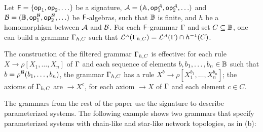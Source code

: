 \begin{theorem}\label{thm:filtering}
  Let $\mathsf{F}={\{ {\mathsf{op}_1, \mathsf{op}_2, \ldots} \}}$ be a signature,
  $\mathcal{A}=(\mathbb{A}, \mathsf{op}^{\mathcal{A}}_1, \mathsf{op}^{\mathcal{A}}_2,
  \ldots)$ and $\mathcal{B}=(\mathbb{B}, \mathsf{op}^{\mathcal{B}}_1,
  \mathsf{op}^{\mathcal{B}}_2, \ldots)$ be $\mathsf{F}$-algebras, such that
  $\mathbb{B}$ is finite, and $h$ be a homomorphism between
  $\mathcal{A}$ and $\mathcal{B}$. For each $\mathsf{F}$-grammar
  $\Gamma$ and set $C \subseteq \mathbb{B}$, one can build a
  grammar $\Gamma_{h,C}$ such that
  $\mathcal{L}_{}^{\scriptscriptstyle{\mathcal{A}}}({\Gamma_{h,C}}) =
  \mathcal{L}_{}^{\scriptscriptstyle{\mathcal{A}}}({\Gamma}) \cap h^{-1}(C)$.
\end{theorem}
\noindent The construction of the filtered grammar $\Gamma_{h,C}$ is
effective: for each rule $X \rightarrow \rho[X_1,\ldots,X_n]$ of
$\Gamma$ and each sequence of elements $b, b_1, \ldots, b_n \in
\mathbb{B}$ such that $b = \rho^{\mathcal{B}}(b_1,\ldots,b_n)$, the
grammar $\Gamma_{h,C}$ has a rule $X^b \rightarrow
\rho[X_1^{b_1},\ldots,X_n^{b_n}]$; the axioms of $\Gamma_{h,C}$ are
$\rightarrow X^c$, for each axiom $\rightarrow X$ of $\Gamma$ and
each element $c \in C$.

The grammars from the rest of the paper use the \hrtext{} signature to
describe parameterized systems. The following example shows two
grammars that specify parameterized systems with chain-like and
star-like network topologies, as in  (b):

